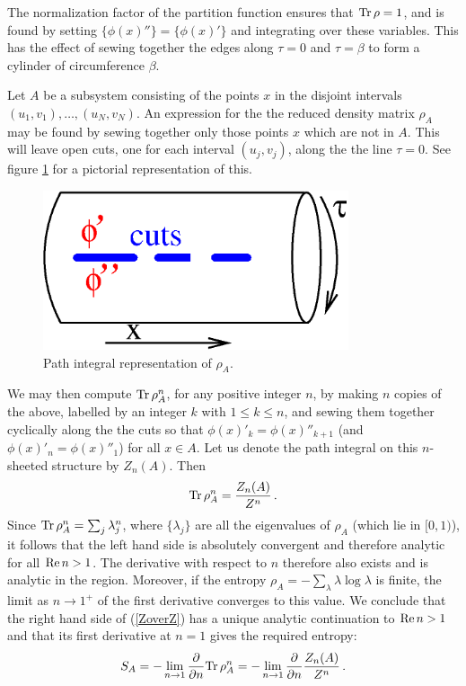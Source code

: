 \documentclass[12pt]{article}
\begin{document}
The normalization factor of the partition function ensures that
${\rm Tr}\,\rho=1$, and is found by 
setting $\{\phi(x)''\}=\{\phi(x)'\}$ and integrating
over these variables. This has the effect of sewing together the edges
along $\tau=0$ and $\tau=\beta$ to form a cylinder of circumference
$\beta$. 


Let $A$ be a subsystem consisting of the points $x$ in the
disjoint intervals $(u_1,v_1),\ldots,(u_N,v_N)$. An expression for the
the reduced density matrix $\rho_A$
may be found %
by sewing together only those points $x$ which are not in $A$. This
will leave open cuts, one for each interval
$(u_j,v_j)$, along the the line $\tau=0$. See figure \ref{cil} for a 
pictorial representation of this.

\begin{figure}[b]
\caption{Path integral representation of $\rho_A$.}
\vspace{2mm}
\centerline{\includegraphics[width=9cm]{cil.eps}}
\label{cil}
\end{figure}

We may then compute ${\rm Tr}\,\rho_A^n$, for any positive
integer $n$, by making $n$ copies of the above, labelled by an integer
$k$ with $1\leq k\leq n$, and sewing them together cyclically along the 
the cuts so that $\phi(x)'_k=\phi(x)''_{k+1}$ (and
$\phi(x)'_n=\phi(x)''_1$) for all $x\in A$. Let us denote the
path integral on this $n$-sheeted structure by $Z_n(A)$.
Then
\begin{equation}
\label{ZoverZ}
{\rm Tr}\,\rho_A^n={Z_n(A)\over Z^n}\,.
\end{equation}
Since ${\rm Tr}\,\rho_A^n=\sum_j\lambda_j^n$,
where $\{\lambda_j\}$ are all the eigenvalues of $\rho_A$ (which lie in 
$[0,1)$), it follows that the left hand side is absolutely convergent and 
therefore analytic for all ${\rm Re}\,n>1$. 
The derivative with respect to $n$ therefore also
exists and is analytic in the region. Moreover, if the entropy
$\rho_A=-\sum_\lambda\lambda\log\lambda$ is finite, the limit as
$n\to1^+$ of the first derivative converges to this value. 
We conclude that the right hand side of (\ref{ZoverZ}) has a unique
analytic continuation to ${\rm Re}\,n>1$ and that its first derivative
at $n=1$ gives the required entropy:
\begin{equation}
S_A= -\lim_{n\to1}{\partial\over\partial n} {\rm Tr}\,\rho_A^n=
-\lim_{n\to1}{\partial\over\partial n}{Z_n(A)\over Z^n}\,.
\end{equation}
\end{document}
